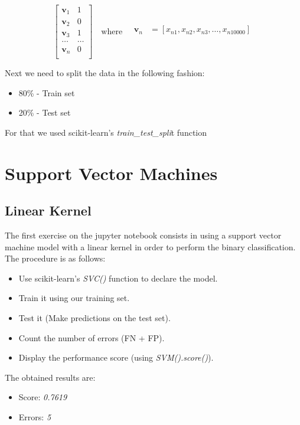 \documentclass{thesisreport}
\begin{document}
\begin{equation*}
\begin{bmatrix}
    \mathbf{v}_1 & 1 \\
    \mathbf{v}_2 & 0 \\
    \mathbf{v}_3 & 1 \\
    \mathbf\dots & \dots \\
    \mathbf{v}_n & 0 \\
\end{bmatrix}
\quad \text{where} \quad
\begin{aligned}
    \mathbf{v}_n &= [x_{n1}, x_{n2}, x_{n3}, \dots, x_{n10000}] \\
\end{aligned}
\end{equation*}

\captionsetup{type=figure}
\captionsetup{justification=centering, labelsep=period}
\newpage

Next we need to split the data in the following fashion:

\begin{itemize}
    \item 80\% - Train set
    \item 20\% - Test set
\end{itemize}

For that we used scikit-learn's \textit{train\_test\_spli}t function

\newpage

\chapter{Support Vector Machines}
 \section{Linear Kernel}
The first exercise on the jupyter notebook consists in using a support vector machine model with a linear kernel in order to perform the binary classification. The procedure is as follows: 
\begin{itemize}
    \item Use scikit-learn's \textit{SVC()} function to declare the model.
    \item Train it using our training set.
    \item Test it (Make predictions on the test set).
    \item  Count the number of errors (FN + FP).
    \item Display the performance score (using \textit{SVM().score()}).
\end{itemize}
The obtained results are:
\begin{itemize}
    \item Score: \textit{0.7619}
    \item Errors: \textit{5}
\end{itemize}
\end{document}
